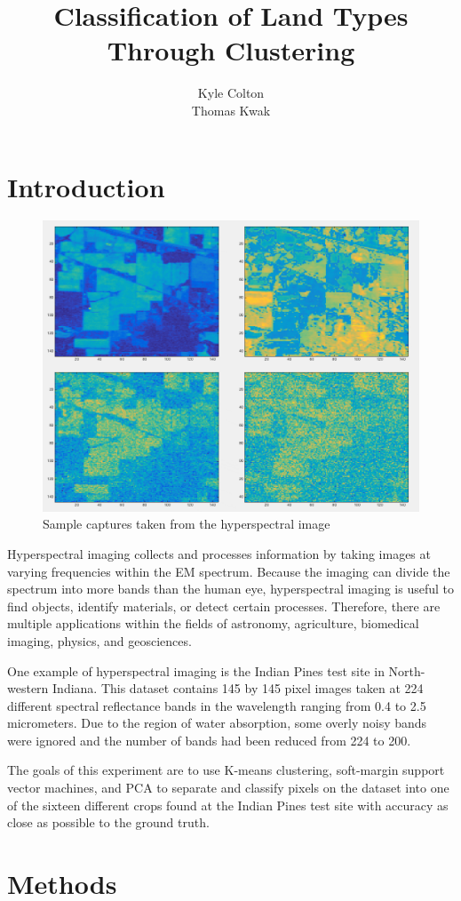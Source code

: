 \documentclass[10pt,letterpaper]{article}
\author{Kyle Colton \\ Thomas Kwak}
\title{Classification of Land Types Through Clustering}
\begin{document}
\maketitle

\section{Introduction}
\begin{figure}
\begin{center}
\includegraphics[width=.28\textwidth]{hyperSample.png}
\end{center}
\caption{Sample captures taken from the hyperspectral image}
\end{figure}
Hyperspectral imaging collects and processes information by taking images at varying frequencies within the EM spectrum. Because the imaging can divide the spectrum into more bands than the human eye, hyperspectral imaging is useful to find objects, identify materials, or detect certain processes. Therefore, there are multiple applications within the fields of astronomy, agriculture, biomedical imaging, physics, and geosciences.

One example of hyperspectral imaging is the Indian Pines test site in North-western Indiana. This dataset contains 145 by 145 pixel images taken at 224 different spectral reflectance bands in the wavelength ranging from 0.4 to 2.5 micrometers. Due to the region of water absorption, some overly noisy bands were ignored and the number of bands had been reduced from 224 to 200.

The goals of this experiment are to use K-means clustering, soft-margin support vector machines, and PCA to separate and classify pixels on the dataset into one of the sixteen different crops found at the Indian Pines test site with accuracy as close as possible to the ground truth.
\section{Methods}
\end{document}
